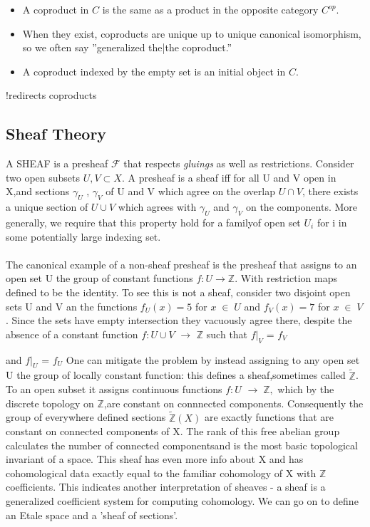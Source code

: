 \documentclass[preprint, 5p, 10pt]{elsarticle}
\theoremstyle{plain}
\begin{document}
\begin{itemize}%
\item A coproduct in $C$ is the same as a product in the opposite category $C^{op}$.


\item When they exist, coproducts are unique up to unique canonical isomorphism, so we often say ''{}generalized the|the coproduct.''{}


\item A coproduct indexed by the empty set is an initial object in $C$.



\end{itemize}
!redirects coproducts


\subsection{Sheaf Theory}
A SHEAF is a presheaf $\mathcal{F}$ that respects \textit{gluings} as well as restrictions. 
Consider two open subsets $U,V \subset X$. A presheaf is a sheaf iff for all U and V open in X,and sections $\gamma_{U}$ , $\gamma_{V}$ of
U and V which agree on the overlap $U \cap V$, there exists a unique section of $U \cup V$ which agrees with $\gamma_{U}$ and $\gamma_{V}$
on the components. More generally, we require that this property hold for a familyof open set ${U_{i}}$ for i in some potentially large indexing set.
   \paragraph{} The canonical example of a non-sheaf presheaf is the presheaf that assigns to an open set U the group of constant functions 
$f: U \rightarrow \mathbb{Z}.$ With restriction maps defined to be the identity. To see this is not a sheaf, consider two disjoint open sets U
and V an the functions $f_{U}(x) = 5$ for $x\;\in\;U$ and $f_{V}(x)=7$ for $x\;\in\;V$. Since the sets have empty intersection they vacuously
agree there, despite the absence of a constant function $f: U \cup V$ $\rightarrow$ $\mathbb{Z}$ such that $f|_{V}$ = $f_{V}$

and $f|_{U}$ = $f_{U}$
One can mitigate the problem by instead assigning to  any open set U the group of locally constant function: this defines a sheaf,sometimes 
called $\mathbb{\tilde{Z}}$.
To an open subset it assigns continuous functions $f:U$ $\rightarrow\;\mathbb{Z},$
which by the discrete topology on $ \mathbb{Z}$,are constant on connnected components. Consequently the group of everywhere defined sections
 $\mathbb{\tilde{Z}}(X)$ are exactly functions that are constant on connected components of X. The rank of this free abelian group calculates the
number of connected componentsand is the most basic topological invariant of a space. This sheaf has even more info about X and has cohomological
data exactly equal to the familiar cohomology of X with $\mathbb{Z}$ coefficients. This indicates another interpretation of sheaves - a sheaf is
a generalized coefficient system for computing cohomology. 
   We can go on to define an Etale space and a 'sheaf of sections'. 
\end{document}
